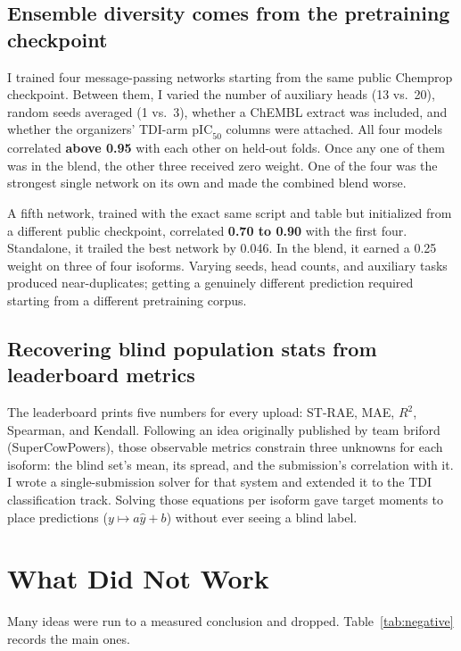 \documentclass[11pt]{article}
\begin{document}
\subsection{Ensemble diversity comes from the pretraining checkpoint}
I trained four message-passing networks starting from the same public Chemprop checkpoint. Between them, I varied the number of auxiliary heads (13 vs.\ 20), random seeds averaged (1 vs.\ 3), whether a ChEMBL extract was included, and whether the organizers' TDI-arm $\text{pIC}_{50}$ columns were attached. All four models correlated \textbf{above 0.95} with each other on held-out folds. Once any one of them was in the blend, the other three received zero weight. One of the four was the strongest single network on its own and made the combined blend worse.

A fifth network, trained with the exact same script and table but initialized from a different public checkpoint, correlated \textbf{0.70 to 0.90} with the first four. Standalone, it trailed the best network by 0.046. In the blend, it earned a 0.25 weight on three of four isoforms. Varying seeds, head counts, and auxiliary tasks produced near-duplicates; getting a genuinely different prediction required starting from a different pretraining corpus.

\subsection{Recovering blind population stats from leaderboard metrics}
The leaderboard prints five numbers for every upload: ST-RAE, MAE, $R^2$, Spearman, and Kendall. Following an idea originally published by team briford (SuperCowPowers), those observable metrics constrain three unknowns for each isoform: the blind set's mean, its spread, and the submission's correlation with it. I wrote a single-submission solver for that system and extended it to the TDI classification track. Solving those equations per isoform gave target moments to place predictions ($y \mapsto a\hat{y} + b$) without ever seeing a blind label.

\section{What Did Not Work}

Many ideas were run to a measured conclusion and dropped. Table~\ref{tab:negative} records the main ones.
\end{document}
